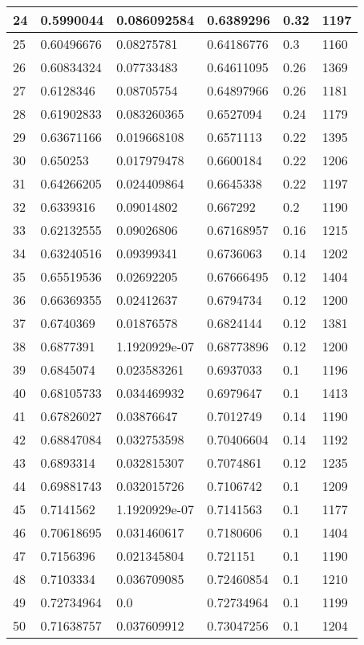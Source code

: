 \begin{longtable}{|l|l|l|l|l|l|}
24 & 0.5990044 & 0.086092584 & 0.6389296 & 0.32 & 1197 \\ \hline 
25 & 0.60496676 & 0.08275781 & 0.64186776 & 0.3 & 1160 \\ \hline 
26 & 0.60834324 & 0.07733483 & 0.64611095 & 0.26 & 1369 \\ \hline 
27 & 0.6128346 & 0.08705754 & 0.64897966 & 0.26 & 1181 \\ \hline 
28 & 0.61902833 & 0.083260365 & 0.6527094 & 0.24 & 1179 \\ \hline 
29 & 0.63671166 & 0.019668108 & 0.6571113 & 0.22 & 1395 \\ \hline 
30 & 0.650253 & 0.017979478 & 0.6600184 & 0.22 & 1206 \\ \hline 
31 & 0.64266205 & 0.024409864 & 0.6645338 & 0.22 & 1197 \\ \hline 
32 & 0.6339316 & 0.09014802 & 0.667292 & 0.2 & 1190 \\ \hline 
33 & 0.62132555 & 0.09026806 & 0.67168957 & 0.16 & 1215 \\ \hline 
34 & 0.63240516 & 0.09399341 & 0.6736063 & 0.14 & 1202 \\ \hline 
35 & 0.65519536 & 0.02692205 & 0.67666495 & 0.12 & 1404 \\ \hline 
36 & 0.66369355 & 0.02412637 & 0.6794734 & 0.12 & 1200 \\ \hline 
37 & 0.6740369 & 0.01876578 & 0.6824144 & 0.12 & 1381 \\ \hline 
38 & 0.6877391 & 1.1920929e-07 & 0.68773896 & 0.12 & 1200 \\ \hline 
39 & 0.6845074 & 0.023583261 & 0.6937033 & 0.1 & 1196 \\ \hline 
40 & 0.68105733 & 0.034469932 & 0.6979647 & 0.1 & 1413 \\ \hline 
41 & 0.67826027 & 0.03876647 & 0.7012749 & 0.14 & 1190 \\ \hline 
42 & 0.68847084 & 0.032753598 & 0.70406604 & 0.14 & 1192 \\ \hline 
43 & 0.6893314 & 0.032815307 & 0.7074861 & 0.12 & 1235 \\ \hline 
44 & 0.69881743 & 0.032015726 & 0.7106742 & 0.1 & 1209 \\ \hline 
45 & 0.7141562 & 1.1920929e-07 & 0.7141563 & 0.1 & 1177 \\ \hline 
46 & 0.70618695 & 0.031460617 & 0.7180606 & 0.1 & 1404 \\ \hline 
47 & 0.7156396 & 0.021345804 & 0.721151 & 0.1 & 1190 \\ \hline 
48 & 0.7103334 & 0.036709085 & 0.72460854 & 0.1 & 1210 \\ \hline 
49 & 0.72734964 & 0.0 & 0.72734964 & 0.1 & 1199 \\ \hline 
50 & 0.71638757 & 0.037609912 & 0.73047256 & 0.1 & 1204 \\ \hline 
\end{longtable}
